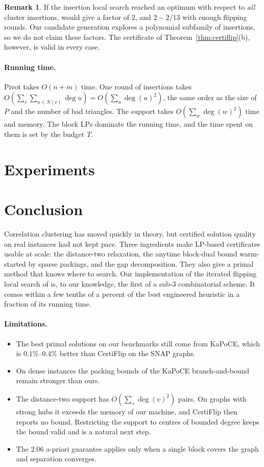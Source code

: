 \documentclass[11pt]{article}
\theoremstyle{definition}
\newtheorem{remark}[theorem]{Remark}
\begin{document}
\begin{remark}
If the insertion local search reached an optimum with respect to
\emph{all} cluster insertions, \citet{CohenAddadLPTYZ24} would give a factor of
$2$, and $2-2/13$ with enough flipping rounds.  Our candidate generation
explores a polynomial subfamily of insertions, so we do not claim these
factors.  The certificate of Theorem~\ref{thm:certiflip}(b), however, is
valid in every case.
\end{remark}

\paragraph{Running time.}  Pivot takes $O(n+m)$ time.  One round of insertions
takes $O(\sum_v\sum_{u\in N(v)}\deg u)=O(\sum_u\deg(u)^2)$, the same order as
the size of $P$ and the number of bad triangles.  The support takes
$O(\sum_w\deg(w)^2)$ time and memory.  The block LPs dominate the running
time, and the time spent on them is set by the budget $T$.

\section{Experiments}\label{sec:exp}


\section{Conclusion}

Correlation clustering has moved quickly in theory, but certified solution
quality on real instances had not kept pace.  Three ingredients make LP-based
certificates usable at scale: the distance-two relaxation, the anytime
block-dual bound warm-started by sparse packings, and the gap decomposition.
They also give a primal method that knows where to search.  Our
implementation of the iterated flipping local search of
\citet{CohenAddadLPTYZ24} is, to our knowledge, the first of a sub-$3$
combinatorial scheme.  It comes within a few tenths of a percent of the
best engineered heuristic in a fraction of its running time.

\paragraph{Limitations.}
\begin{itemize}
\item The best primal solutions on our benchmarks still come from KaPoCE,
which is $0.1\%$--$0.4\%$ better than CertiFlip on the SNAP graphs.
\item On dense instances the packing bounds of the KaPoCE branch-and-bound
remain stronger than ours.
\item The distance-two support has $O(\sum_v\deg(v)^2)$ pairs.  On graphs
with strong hubs it exceeds the memory of our machine, and CertiFlip then
reports no bound.  Restricting the support to centres of bounded degree keeps
the bound valid and is a natural next step.
\item The $2.06$ a-priori guarantee applies only when a single block covers
the graph and separation converges.
\end{itemize}
\end{document}
